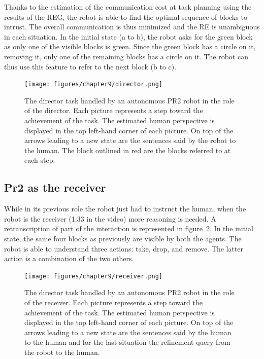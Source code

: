 Thanks to the estimation of the communication cost at task planning using the results of the REG, the robot is able to find the optimal sequence of blocks to intrust. The overall communication is thus minimized and the RE is unambiguous in each situation. In the initial state (a to b), the robot asks for the green block as only one of the visible blocks is green. Since the green block has a circle on it, removing it, only one of the remaining blocks has a circle on it. The robot can thus use this feature to refer to the next block (b to c).

\begin{figure}[ht!]
\centering
\texttt{[image: figures/chapter9/director.png]}
\caption{\label{fig:chap9_director} The director task handled by an autonomous PR2 robot in the role of the director. Each picture represents a step toward the achievement of the task. The estimated human perspective is displayed in the top left-hand corner of each picture. On top of the arrows leading to a new state are the sentences said by the robot to the human. The block outlined in red are the blocks referred to at each step. }
\end{figure}

\subsection{Pr2 as the receiver}

While in its previous role the robot just had to instruct the human, when the robot is the receiver (1:33 in the video) more reasoning is needed. A retranscription of part of the interaction is represented in figure~\ref{fig:chap9_receiver}. In the initial state, the same four blocks as previously are visible by both the agents. The robot is able to understand three actions: take, drop, and remove. The latter action is a combination of the two others.

\begin{figure}[ht!]
\centering
\texttt{[image: figures/chapter9/receiver.png]}
\caption{\label{fig:chap9_receiver} The director task handled by an autonomous PR2 robot in the role of the receiver. Each picture represents a step toward the achievement of the task. The estimated human perspective is displayed in the top left-hand corner of each picture. On top of the arrows leading to a new state are the sentences said by the human to the human and for the last situation the refinement query from the robot to the human. }
\end{figure}


